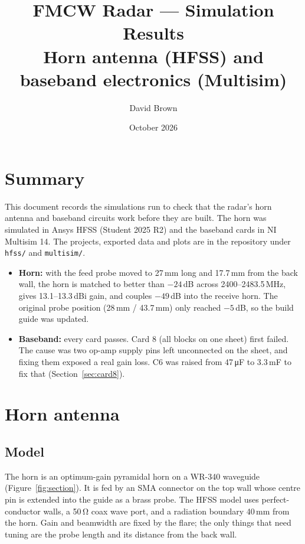 \documentclass[11pt]{article}
\title{FMCW Radar --- Simulation Results\\\large Horn antenna (HFSS) and baseband electronics (Multisim)}
\author{David Brown}
\date{October 2026}
\begin{document}
\maketitle

\section*{Summary}

This document records the simulations run to check that the radar's horn antenna and baseband
circuits work before they are built. The horn was simulated in Ansys HFSS (Student 2025 R2) and the
baseband cards in NI Multisim 14. The projects, exported data and plots are in the repository under
\texttt{hfss/} and \texttt{multisim/}.

\begin{itemize}
  \item \textbf{Horn:} with the feed probe moved to 27\,mm long and 17.7\,mm from the back wall,
        the horn is matched to better than $-24$\,dB across 2400--2483.5\,MHz, gives 13.1--13.3\,dBi
        gain, and couples $-49$\,dB into the receive horn. The original probe position
        (28\,mm / 43.7\,mm) only reached $-5$\,dB, so the build guide was updated.
  \item \textbf{Baseband:} every card passes. Card 8 (all blocks on one sheet) first failed. The cause
        was two op-amp supply pins left unconnected on the sheet, and fixing them exposed a real gain loss.
        C6 was raised from 47\,\si{\micro\farad} to 3.3\,mF to fix that (Section~\ref{sec:card8}).
\end{itemize}

\section{Horn antenna}

\FloatBarrier
\subsection{Model}
The horn is an optimum-gain pyramidal horn on a WR-340 waveguide (Figure~\ref{fig:section}).
It is fed by an SMA connector on the top wall whose centre pin is extended into the guide as a
brass probe. The HFSS model uses perfect-conductor walls, a 50\,\si{\ohm} coax wave port, and a
radiation boundary 40\,mm from the horn. Gain and beamwidth are fixed by the flare; the only things
that need tuning are the probe length and its distance from the back wall.
\end{document}
